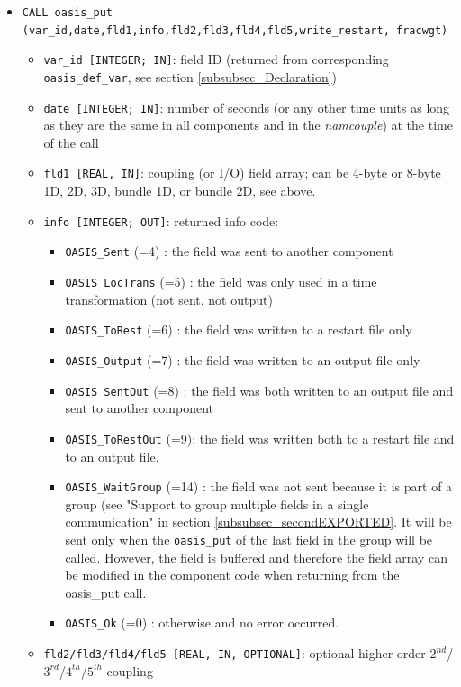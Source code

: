 \begin{itemize}
\item {\tt CALL oasis\_put (var\_id,date,fld1,info,fld2,fld3,fld4,fld5,write\_restart, \newline fracwgt)}
  \begin{itemize}
  \item {\tt var\_id [INTEGER; IN]}: field ID (returned from corresponding {\tt
      oasis\_def\_var}, see section \ref{subsubsec_Declaration})
  \item {\tt date [INTEGER; IN]}: number of seconds (or any other time
    units as long as they are the same in all components and in the {\it
      namcouple}) at the time of the call 
  \item {\tt fld1 [REAL, IN]}: coupling (or I/O) field array; can be
    4-byte or 8-byte 1D, 2D, 3D, bundle 1D, or bundle 2D, see above.
  \item {\tt info [INTEGER; OUT]}: returned info code:
    \begin{itemize}
    \item {\tt OASIS\_Sent} (=4) : the field was sent to another component
    \item {\tt OASIS\_LocTrans} (=5) : the field was only used in a time
      transformation (not sent, not output)
    \item {\tt OASIS\_ToRest} (=6) : the field was written to a restart
      file only
    \item {\tt OASIS\_Output} (=7) : the field was written to an output
      file only
    \item {\tt OASIS\_SentOut} (=8) : the field was both written to an
      output file and sent to another component
    \item {\tt OASIS\_ToRestOut} (=9): the field was written both to a
      restart file and to an output file.
    \item {\tt OASIS\_WaitGroup} (=14) : the field was not sent because it is part of a group (see "Support to group multiple fields in a single communication" in section \ref{subsubsec_secondEXPORTED}.
    It will be sent only when the {\tt oasis\_put} of the last field in the group will be called. However, the field is buffered and therefore the field array can be modified in the component code when returning from the oasis\_put call.
    \item {\tt OASIS\_Ok} (=0) : otherwise and no error occurred.
    \end{itemize}
  \item {\tt fld2/fld3/fld4/fld5 [REAL, IN, OPTIONAL]}: optional higher-order $2^{nd}$/$3^{rd}$/$4^{th}$/$5^{th}$ coupling

\end{itemize}
\end{itemize}

